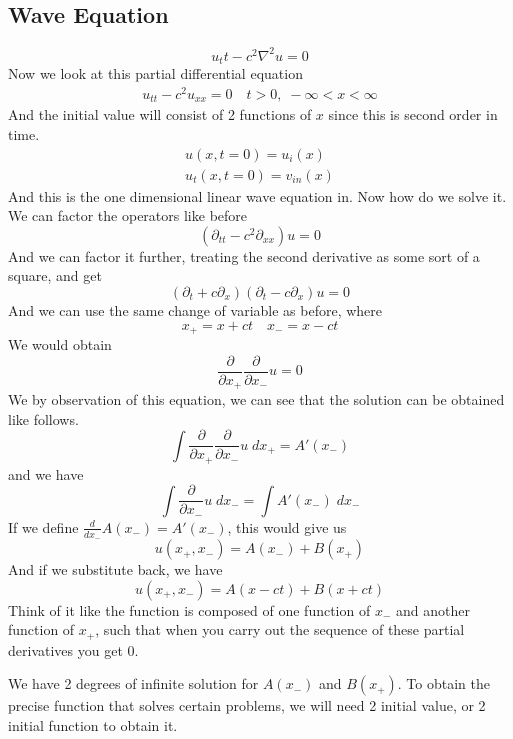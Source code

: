 \documentclass[12pt]{book}
\newcommand{\dydx}[2]{\frac{d #1}{d #2}}
\newcommand{\paren}[1]{\left( #1 \right)}
\begin{document}
\subsection{Wave Equation}
\[
u_tt - c^2\nabla^2 u =0
\]
Now we look at this partial differential equation
\begin{align}
    u_{tt} - c^2u_{xx} = 0 \quad t>0,\; -\infty<x<\infty
\end{align}
And the initial value will consist of 2 functions of $x$ since this is second order in time. 
\begin{align}
    u(x,t=0)=u_{i}(x)\\
    u_t(x,t=0)=v_{in}(x)
\end{align}
And this is the one dimensional linear wave equation in. Now how do we solve it. We can factor the operators like before
\[
\paren{\partial_{tt}-c^2\partial_{xx}}u = 0
\]
And we can factor it further, treating the second derivative as some sort of a square, and get
\[
\paren{\partial_t + c\partial_x}\paren{\partial_t - c\partial_x}u = 0
\]
And we can use the same change of variable as before, where
\[
x_+ = x+ct \quad x_- = x-ct
\]
We would obtain
\[
\frac{\partial}{\partial x_+}\frac{\partial}{\partial x_-} u = 0
\]
We by observation of this equation, we can see that the solution can be obtained like follows.
\[
\int \frac{\partial}{\partial x_+}\frac{\partial}{\partial x_-} u \; dx_+= A'(x_-) 
\]
and we have
\[
\int \frac{\partial}{\partial x_-} u \; dx_-= \int A'(x_-) \; dx_-
\]
If we define $\dydx{}{x_-}A(x_-)=A'(x_-)$, this would give us
\[
u(x_+,x_-)=A(x_-)+B(x_+)
\]
And if we substitute back, we have
\[
u(x_+,x_-)=A(x-ct)+B(x+ct)
\]
Think of it like the function is composed of one function of $x_-$ and another function of $x_+$, such that when you carry out the sequence of these partial derivatives you get 0. 

We have 2 degrees of infinite solution for $A(x_-)$ and $B(x_+)$. To obtain the precise function that solves certain problems, we will need 2 initial value, or 2 initial function to obtain it. 
\end{document}
